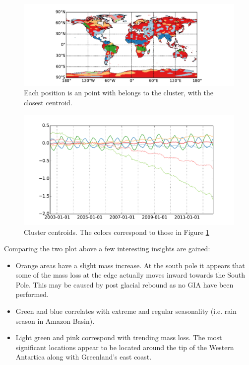 \begin{figure}[H]
	\center
	\includegraphics[width=\textwidth]{figures/kmeans-world}
	\caption{Each position is an point with belongs to the cluster, with the closest centroid.}
	\label{fig:kmeans-world}
\end{figure}
\begin{figure}[H]
	\center
	\includegraphics[width=\textwidth]{figures/kmeans-centroids}
	\caption{Cluster centroids. The colors correspond to those in Figure \ref{fig:kmeans-world}}
	\label{fig:kmeans-centroids}
\end{figure}

Comparing the two plot above a few interesting insights are gained:
\begin{itemize}
	\item Orange areas have a slight mass increase. At the south pole it appears that some of the mass loss at the edge actually moves inward towards the South Pole. This may be caused by post glacial rebound as no GIA have been performed.
	\item  Green and blue correlates with extreme and regular seasonality (i.e. rain season in Amazon Basin).
	\item Light green and pink correspond with trending mass loss. The most significant locations appear to be located around the tip of the Western Antartica along with Greenland's east coast.
\end{itemize}
